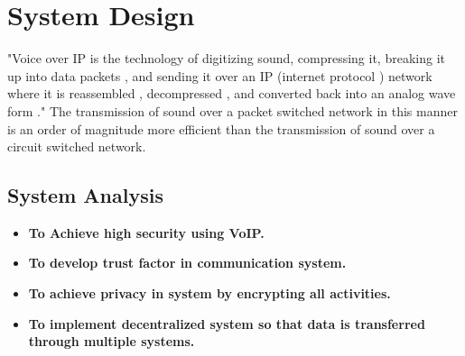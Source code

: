 \chapter{System Design}
\justify
\quad 
"Voice over IP is the technology of digitizing sound, compressing it, breaking it up into data packets , and sending it over an IP (internet protocol ) network where it is reassembled , decompressed , and converted back into an analog wave form ." The transmission of sound over a packet switched network in this manner is an order of magnitude more efficient than the transmission of sound over a circuit switched network.

\section{System Analysis}
\justify
\quad
\begin{itemize}
    \item \textbf{To Achieve high security using VoIP.}
    \item \textbf{To develop trust factor in communication system.}
    \item \textbf{To achieve privacy in system by encrypting all activities.}
    \item \textbf{To implement decentralized system so that data is transferred through multiple systems.}
\end{itemize}

